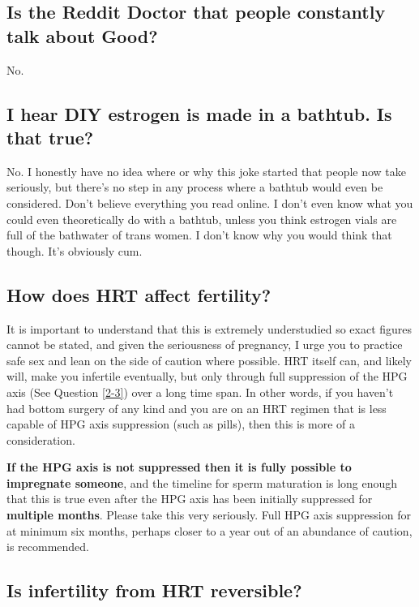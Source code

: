 \documentclass{article}
\begin{document}
\subsection{Is the Reddit Doctor that people constantly talk about Good?}

No.

\subsection{I hear DIY estrogen is made in a bathtub. Is that true?}

No. I honestly have no idea where or why this joke started that people now take seriously, but there’s no step in any process where a bathtub would even be considered. Don’t believe everything you read online. I don’t even know what you could even theoretically do with a bathtub, unless you think estrogen vials are full of the bathwater of trans women. I don’t know why you would think that though. It’s obviously cum.

\subsection{How does HRT affect fertility?}\label{11-42}

It is important to understand that this is extremely understudied so exact figures cannot be stated, and given the seriousness of pregnancy, I urge you to practice safe sex and lean on the side of caution where possible. HRT itself can, and likely will, make you infertile eventually, but only through full suppression of the HPG axis (See Question \ref{2-3}) over a long time span. In other words, if you haven't had bottom surgery of any kind and you are on an HRT regimen that is less capable of HPG axis suppression (such as pills), then this is more of a consideration.

\textbf{If the HPG axis is not suppressed then it is fully possible to impregnate someone}, and the timeline for sperm maturation is long enough that this is true even after the HPG axis has been initially suppressed for \textbf{multiple months}. Please take this very seriously. Full HPG axis suppression for at minimum six months, perhaps closer to a year out of an abundance of caution, is recommended.

\subsection{Is infertility from HRT reversible?}\label{11-43}
\end{document}
